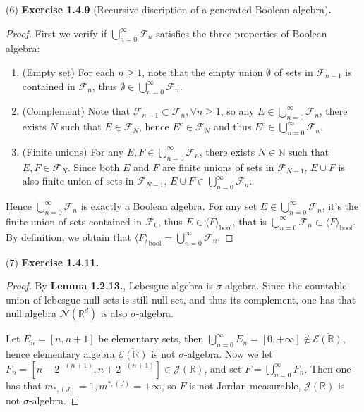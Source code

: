 \documentclass[a4paper]{article}
\begin{document}
(6) {\bfseries Exercise 1.4.9} (Recursive discription of a generated Boolean algebra){\bfseries .}\begin{proof}
First we verify if $\bigcup_{n = 0}^\infty \mathcal{F}_n$ satisfies the three properties of Boolean algebra:
\begin{enumerate}[label = (\roman*)]
    \item (Empty set) For each $n \geq 1$, note that the empty union $\emptyset$ of sets in $\mathcal{F}_{n - 1}$
    is contained in $\mathcal{F}_n$, thus $\emptyset \in \bigcup_{n = 0}^\infty \mathcal{F}_n$.
    \item (Complement) Note that $\mathcal{F}_{n - 1} \subset \mathcal{F}_n, \forall n \geq 1$, so any 
    $E \in \bigcup_{n = 0}^\infty \mathcal{F}_n$, there exists $N$ such that $E \in \mathcal{F}_N$, hence $E^c \in \mathcal{F}_N$
    and thus $E^c \in \bigcup_{n = 0}^\infty \mathcal{F}_n$.
    \item (Finite unions) For any $E, F \in \bigcup_{n = 0}^\infty \mathcal{F}_n$, there exists $N \in \mathbb{N}$
    such that $E, F \in \mathcal{F}_N$. Since both $E$ and $F$ are finite unions of sets in $\mathcal{F}_{N - 1}$, 
    $E \cup F$ is also finite union of sets in $\mathcal{F}_{N - 1}$, $E \cup F \in \bigcup_{n = 0}^\infty \mathcal{F}_n$.
\end{enumerate}
Hence $\bigcup_{n = 0}^\infty \mathcal{F}_n$ is exactly a Boolean algebra. For any set $E \in \bigcup_{n = 0}^\infty \mathcal{F}_n$,
it's the finite union of sets contained in $\mathcal{F}_0$, thus $E \in \langle F \rangle_{\mathrm{bool}}$, that is 
$\bigcup_{n = 0}^\infty \mathcal{F}_n \subset \langle F \rangle_{\mathrm{bool}}$. By definition, we obtain that
$\langle F \rangle_{\mathrm{bool}} = \bigcup_{n = 0}^\infty \mathcal{F}_n$.
\end{proof}

(7) {\bfseries Exercise 1.4.11.}\begin{proof}
By {\bfseries Lemma 1.2.13.}, Lebesgue algebra is $\sigma$-algebra. Since the countable union of lebesgue null sets 
is still null set, and thus its complement, one has that null algebra $\mathcal{N}(\mathbb{R}^d)$ is also $\sigma$-algebra.

Let $E_n = [n, n + 1]$ be elementary sets, then $\bigcup_{n = 0}^\infty E_n = [0, +\infty] \not\in \overline
{\mathcal{E}(\mathbb{R})}$, hence elementary algebra $\overline{\mathcal{E}(\mathbb{R})}$ is not $\sigma$-algebra.
Now we let $F_n = [n - 2^{-(n + 1)}, n + 2^{-(n + 1)}] \in \overline{\mathcal{J}(\mathbb{R})}$, and set $F = \bigcup_{n = 0}^\infty F_n$.
Then one has that $m_{*, (J)} = 1, m^{*, (J)} = +\infty$, so $F$ is not Jordan measurable, $\overline{\mathcal{J}(\mathbb{R})}$
is not $\sigma$-algebra.
\end{proof}
\end{document}
